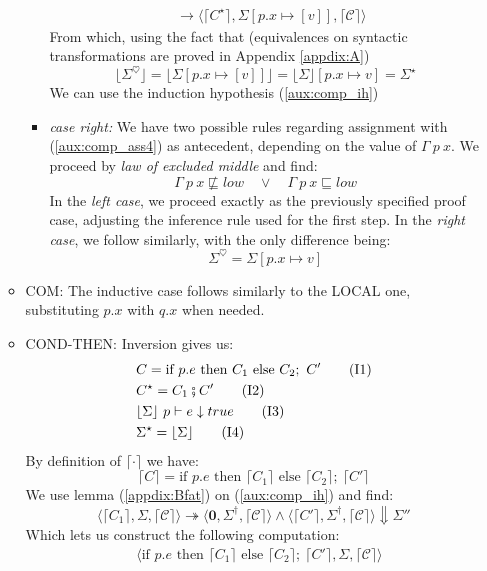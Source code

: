\documentclass[12pt,a4paper,twoside]{book}
\newcommand{\heart}{\heartsuit}
\begin{document}
\begin{itemize}
\begin{itemize}
\begin{itemize}
\begin{align*}
&\rightarrow\langle \lceil C^\star \rceil, \Sigma[p.x \mapsto [v]], \lceil \mathscr{C} \rceil \rangle
\end{align*}
From which, using the fact that (equivalences on syntactic transformations are proved in Appendix \ref{appdix:A})
$$
		\lfloor\Sigma^\heart\rfloor = \lfloor \Sigma[p.x \mapsto [v]] \rfloor = \lfloor \Sigma \rfloor[p.x \mapsto v] = \Sigma^\star
$$
We can use the induction hypothesis (\ref{aux:comp_ih})
\item \emph{case right:} We have two possible rules regarding assignment with (\ref{aux:comp_ass4}) as antecedent, depending on the value of $\Gamma~p~x$. We proceed by \emph{law of excluded middle} and find:
\begin{equation}\label{aux:comp_ass5}
\Gamma~p~x \not\sqsubseteq low \quad \lor \quad
\Gamma~p~x \sqsubseteq low
\end{equation}
In the \emph{left case}, we proceed exactly as the previously specified proof case, adjusting the inference rule used for the first step. In the \emph{right case}, we follow similarly, with the only difference being:
$$
\Sigma^\heart = \Sigma[p.x\mapsto v]
$$
\end{itemize}
\item COM: The inductive case follows similarly to the LOCAL one, substituting $p.x$ with $q.x$ when needed.
\item COND-THEN: Inversion gives us:
\begin{align}
&C = \text{if } p.e \text{ then } C_1 \text{ else } C_2;~ C' \label{aux:comp_then1}\tag{I1}\\
	&C^\star = C_1 \fatsemi C'\label{aux:comp_then2}\tag{I2}\\
&\lfloor \Sigma \rfloor~p \vdash e \downarrow true \label{aux:comp_then3}\tag{I3}\\
&\Sigma^\star = \lfloor \Sigma \rfloor\label{aux:comp_then4}\tag{I4}
\end{align}
By definition of $\lceil \cdot \rceil$ we have:
$$
\lceil C\rceil = \text{if } p.e \text{ then } \lceil C_1\rceil \text{ else }\lceil C_2\rceil;~ \lceil C'\rceil
$$
We use lemma (\ref{appdix:Bfat}) on (\ref{aux:comp_ih}) and find:
$$
\langle \lceil C_1 \rceil, \Sigma, \lceil \mathscr{C} \rceil \rangle \twoheadrightarrow \langle \boldsymbol{0}, \Sigma^\dag, \lceil \mathscr{C} \rceil \rangle 
\land
\langle \lceil C' \rceil, \Sigma^\dag, \lceil \mathscr{C} \rceil \rangle \Downarrow \Sigma''
$$
Which lets us construct the following computation:
\begin{align*}
&\langle \text{if } p.e \text{ then } \lceil C_1\rceil \text{ else }\lceil C_2\rceil;~ \lceil C'\rceil, \Sigma, \lceil \mathscr{C}\rceil\rangle\\

\end{align*}
\end{itemize}
\end{itemize}
\end{document}

